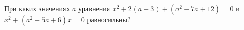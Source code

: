 \begin{ex}
	\begin{condition}
		При каких значениях \( a \) уравнения \( x^2+2(a-3)+(a^2-7a+12)=0 \) и \( x^2+(a^2-5a+6)x=0 \) равносильны?
	\end{condition}
\end{ex}